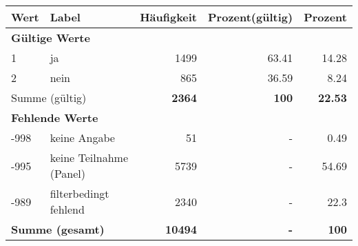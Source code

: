      \begin{longtable}{lXrrr}
     \toprule
     \textbf{Wert} & \textbf{Label} & \textbf{Häufigkeit} & \textbf{Prozent(gültig)} & \textbf{Prozent} \\
     \endhead
     \midrule
     \multicolumn{5}{l}{\textbf{Gültige Werte}}\\

     1 &
     \multicolumn{1}{X}{ ja   } &


       \num{1499} &
       \num[round-mode=places,round-precision=2]{63,41} &
         \num[round-mode=places,round-precision=2]{14,28} \\

     2 &
     \multicolumn{1}{X}{ nein   } &


       \num{865} &
       \num[round-mode=places,round-precision=2]{36,59} &
         \num[round-mode=places,round-precision=2]{8,24} \\
     \midrule
     \multicolumn{2}{l}{Summe (gültig)} &
       \textbf{\num{2364}} &
     \textbf{100} &
       \textbf{\num[round-mode=places,round-precision=2]{22,53}} \\
     \multicolumn{5}{l}{\textbf{Fehlende Werte}}\\
       -998 &
       keine Angabe &
         \num{51} &
        - &
         \num[round-mode=places,round-precision=2]{0,49} \\
       -995 &
       keine Teilnahme (Panel) &
         \num{5739} &
        - &
         \num[round-mode=places,round-precision=2]{54,69} \\
       -989 &
       filterbedingt fehlend &
         \num{2340} &
        - &
         \num[round-mode=places,round-precision=2]{22,3} \\
     \midrule
     \multicolumn{2}{l}{\textbf{Summe (gesamt)}} &
          \textbf{\num{10494}} &
        \textbf{-} &
        \textbf{100} \\
     \bottomrule
     \end{longtable}
     
